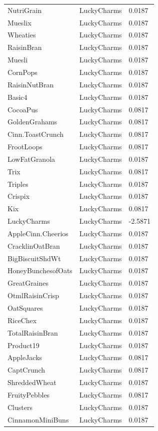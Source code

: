 \begin{table}[!htbp]
\begin{tabular}{lll}
NutriGrain & LuckyCharms & 0.0187
\\
Mueslix & LuckyCharms & 0.0187
\\
Wheaties & LuckyCharms & 0.0187
\\
RaisinBran & LuckyCharms & 0.0187
\\
Muesli & LuckyCharms & 0.0187
\\
CornPops & LuckyCharms & 0.0187
\\
RaisinNutBran & LuckyCharms & 0.0187
\\
Basic4 & LuckyCharms & 0.0187
\\
CocoaPus & LuckyCharms & 0.0817
\\
GoldenGrahams & LuckyCharms & 0.0817
\\
Cinn.ToastCrunch & LuckyCharms & 0.0817
\\
FrootLoops & LuckyCharms & 0.0817
\\
LowFatGranola & LuckyCharms & 0.0187
\\
Trix & LuckyCharms & 0.0817
\\
Triples & LuckyCharms & 0.0187
\\
Crispix & LuckyCharms & 0.0187
\\
Kix & LuckyCharms & 0.0817
\\
LuckyCharms & LuckyCharms & -2.5871
\\
AppleCinn.Cheerios & LuckyCharms & 0.0187
\\
CracklinOatBran & LuckyCharms & 0.0187
\\
BigBiscuitShdWt & LuckyCharms & 0.0187
\\
HoneyBunchesofOats & LuckyCharms & 0.0187
\\
GreatGraines & LuckyCharms & 0.0187
\\
OtmlRaisinCrisp & LuckyCharms & 0.0187
\\
OatSquares & LuckyCharms & 0.0187
\\
RiceChex & LuckyCharms & 0.0187
\\
TotalRaisinBran & LuckyCharms & 0.0187
\\
Product19 & LuckyCharms & 0.0187
\\
AppleJacks & LuckyCharms & 0.0817
\\
CaptCrunch & LuckyCharms & 0.0817
\\
ShreddedWheat & LuckyCharms & 0.0187
\\
FruityPebbles & LuckyCharms & 0.0817
\\
Clusters & LuckyCharms & 0.0187
\\
CinnamonMiniBuns & LuckyCharms & 0.0187

\end{tabular}
\end{table}
